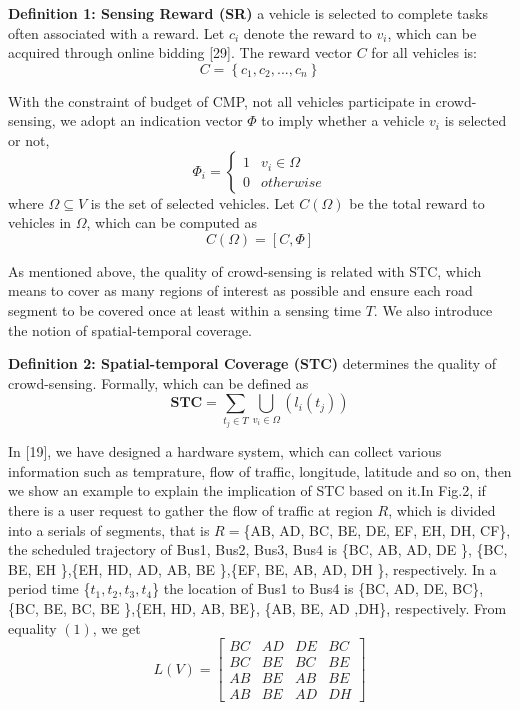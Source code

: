 \documentclass[journal]{IEEEtran}
\begin{document}
\noindent
\textbf{Definition 1: Sensing Reward (SR)} a vehicle is selected to complete tasks often associated with a reward. Let $c_{i}$ denote the reward to $v_{i}$, which can be acquired through online bidding [29]. The reward vector $C$ for all vehicles is:
\begin{equation}
C=\left \{c_{1},c_{2},...,c_{n} \right \}
\end{equation}

With the constraint of budget of CMP, not all vehicles participate in crowd-sensing, we adopt an indication vector $\Phi $ to imply whether a vehicle $v_{i}$ is selected or not,
\begin{equation}
\Phi_{i}= \left\{\begin{matrix}
1&v_{i}\in \Omega \\ 
0&otherwise\end{matrix}\right.
\end{equation}
where $\Omega \subseteq V$ is the set of selected vehicles. Let $C(\Omega)$ be the total reward to vehicles in $\Omega$, which can be computed as
\begin{equation}
C(\Omega )=\left [ C,\Phi  \right ]
\end{equation}

As mentioned above, the quality of crowd-sensing is related with STC, which means to cover as many regions of interest as possible and ensure each road segment to be covered once at least within a sensing time $T$. We  also introduce the notion of spatial-temporal coverage.

\noindent
\textbf{Definition 2: Spatial-temporal Coverage (STC)} determines the quality of crowd-sensing. Formally, which can be defined as
\begin{equation}
\textbf{STC}=\sum_{t_{j}\in T}\bigcup_{v_{i}\in \Omega}\left (l_{i}(t_{j}) \right)
\end{equation}

 In [19], we have designed a hardware system, which can collect various information such as temprature, flow of traffic, longitude, latitude and so on, then we show an example to explain the implication of STC based on it.In Fig.2, if there is a user request to gather the flow of traffic at region $R$, which is divided into a serials of segments, that is $R=$\{AB, AD, BC, BE, DE, EF, EH, DH, CF\}, the scheduled trajectory of Bus1, Bus2, Bus3, Bus4 is \{BC, AB, AD, DE \}, \{BC, BE, EH \},\{EH, HD, AD, AB, BE \},\{EF, BE, AB, AD, DH \}, respectively. In a period time \{$t_{1},t_{2},t_{3},t_{4}$\}  the location of  Bus1 to Bus4 is \{BC, AD, DE, BC\}, \{BC, BE, BC, BE \},\{EH, HD, AB, BE\}, \{AB, BE, AD ,DH\}, respectively. From equality $(1)$, we get
\begin{equation}
L(V)=\begin{bmatrix}
BC &AD &DE &BC \\ 
BC& BE &BC &BE\\ 
AB& BE &AB &BE\\ 
AB& BE &AD &DH
\end{bmatrix}
\end{equation}
\end{document}
